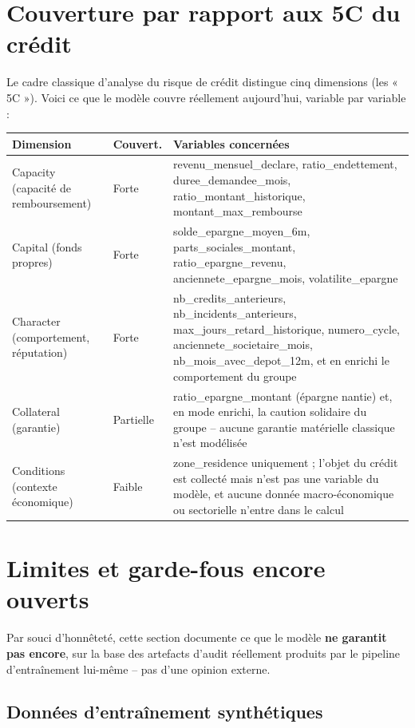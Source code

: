 \documentclass[11pt,a4paper]{article}
\begin{document}
\section{Couverture par rapport aux 5C du crédit}

Le cadre classique d'analyse du risque de crédit distingue cinq dimensions (les « 5C »). Voici ce
que le modèle couvre réellement aujourd'hui, variable par variable :

\begin{center}
\begin{tabular}{L{2.7cm}L{1.8cm}L{9cm}}
\toprule
\textbf{Dimension} & \textbf{Couvert.} & \textbf{Variables concernées} \\
\midrule
Capacity (capacité de remboursement) & Forte & revenu\_mensuel\_declare, ratio\_endettement, duree\_demandee\_mois, ratio\_montant\_historique, montant\_max\_rembourse \\
Capital (fonds propres) & Forte & solde\_epargne\_moyen\_6m, parts\_sociales\_montant, ratio\_epargne\_revenu, anciennete\_epargne\_mois, volatilite\_epargne \\
Character (comportement, réputation) & Forte & nb\_credits\_anterieurs, nb\_incidents\_anterieurs, max\_jours\_retard\_historique, numero\_cycle, anciennete\_societaire\_mois, nb\_mois\_avec\_depot\_12m, et en enrichi le comportement du groupe \\
Collateral (garantie) & Partielle & ratio\_epargne\_montant (épargne nantie) et, en mode enrichi, la caution solidaire du groupe -- aucune garantie matérielle classique n'est modélisée \\
Conditions (contexte économique) & Faible & zone\_residence uniquement ; l'objet du crédit est collecté mais n'est pas une variable du modèle, et aucune donnée macro-économique ou sectorielle n'entre dans le calcul \\
\bottomrule
\end{tabular}
\end{center}

\section{Limites et garde-fous encore ouverts}

Par souci d'honnêteté, cette section documente ce que le modèle \textbf{ne garantit pas encore},
sur la base des artefacts d'audit réellement produits par le pipeline d'entraînement lui-même --
pas d'une opinion externe.

\subsection{Données d'entraînement synthétiques}
\end{document}
